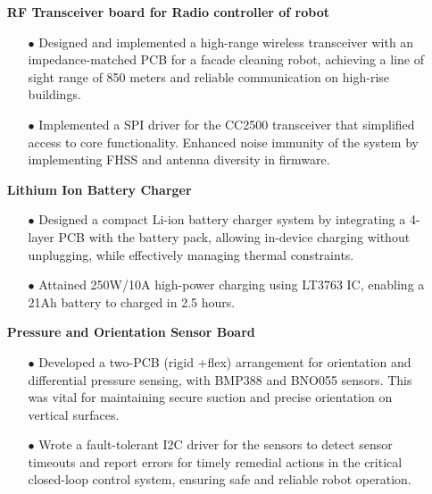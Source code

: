 \documentclass[a4,11pt]{article}
\begin{document}
      \begin{itemize}[leftmargin=0.01in]
        \item[]  \textbf{RF Transceiver board for Radio controller of robot}
            \begin{itemize}\setlength{\itemsep}{0pt}\setlength{\parskip}{0pt}\vspace{-0.3em}
                \item[$\bullet$]  Designed and implemented a high-range wireless transceiver with an impedance-matched PCB for a facade cleaning robot, achieving a line of sight range of 850 meters and reliable communication on high-rise buildings.
                \item[$\bullet$] Implemented a  SPI driver for the CC2500 transceiver that simplified access to core functionality. Enhanced noise immunity of the system by implementing FHSS and antenna diversity in firmware.
            \end{itemize}
        \item[]  \textbf{Lithium Ion Battery Charger}
            \begin{itemize}\setlength{\itemsep}{0pt}\setlength{\parskip}{0pt}\vspace{-0.3em}
                \item[$\bullet$] Designed a compact Li-ion battery charger system by integrating a 4-layer PCB with the battery pack, allowing in-device charging without unplugging, while effectively managing thermal constraints. 
                \item[$\bullet$] Attained 250W/10A high-power charging using LT3763 IC, enabling a 21Ah battery to charged in 2.5 hours.
            \end{itemize}
        \item[]  \textbf{Pressure and Orientation Sensor Board}
            \begin{itemize}\setlength{\itemsep}{0pt}\setlength{\parskip}{0pt}\vspace{-0.3em}
                \item[$\bullet$] Developed a two-PCB (rigid +flex) arrangement for orientation and differential pressure sensing, with BMP388 and BNO055 sensors. This was vital for maintaining secure suction and precise orientation on vertical surfaces.
                \item[$\bullet$] Wrote a fault-tolerant I2C driver for the sensors to detect sensor timeouts and report errors for timely remedial actions in the critical closed-loop control system, ensuring safe and reliable robot operation.

\end{itemize}
\end{itemize}
\end{document}
